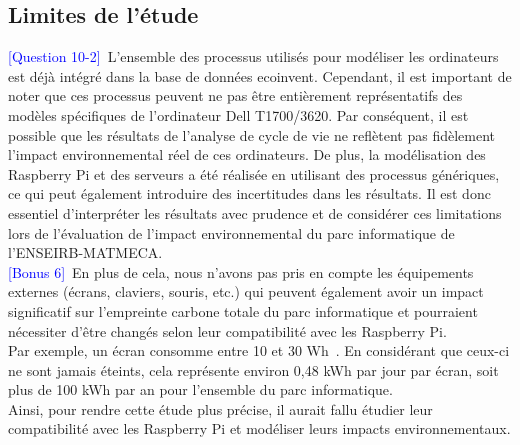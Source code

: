 \documentclass[12pt,a4paper]{paper}
\begin{document}
\subsection{Limites de l'étude}
\textcolor{blue}{[Question 10-2]}~L'ensemble des processus utilisés pour modéliser les ordinateurs est déjà intégré dans la base de données ecoinvent. Cependant, il est important de noter que ces processus peuvent ne pas être entièrement représentatifs des modèles spécifiques de l'ordinateur Dell T1700/3620. Par conséquent, il est possible que les résultats de l'analyse de cycle de vie ne reflètent pas fidèlement l'impact environnemental réel de ces ordinateurs. De plus, la modélisation des Raspberry Pi et des serveurs a été réalisée en utilisant des processus génériques, ce qui peut également introduire des incertitudes dans les résultats. Il est donc essentiel d'interpréter les résultats avec prudence et de considérer ces limitations lors de l'évaluation de l'impact environnemental du parc informatique de l'ENSEIRB-MATMECA.\\
\textcolor{blue}{[Bonus 6]}~En plus de cela, nous n'avons pas pris en compte les équipements externes (écrans, claviers, souris, etc.) qui peuvent également avoir un impact significatif sur l'empreinte carbone totale du parc informatique et pourraient nécessiter d'être changés selon leur compatibilité avec les Raspberry Pi. \\
Par exemple, un écran consomme entre 10 et 30 Wh~\cite{maitriserenergie2024}. En considérant que ceux-ci ne sont jamais éteints, cela représente environ 0,48 kWh par jour par écran, soit plus de 100 kWh par an pour l'ensemble du parc informatique. \\
Ainsi, pour rendre cette étude plus précise, il aurait fallu étudier leur compatibilité avec les Raspberry Pi et modéliser leurs impacts environnementaux.


\end{document}
